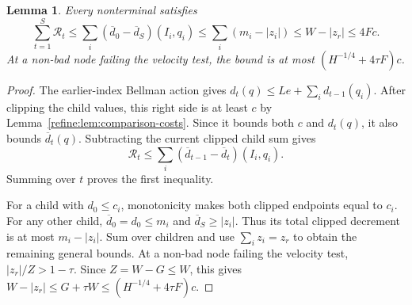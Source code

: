 \documentclass[11pt]{article}
\newtheorem{lemma}[theorem]{Lemma}
\theoremstyle{definition}
\newcommand{\1}{\mathbf 1}
\begin{document}
\begin{lemma}\label{refine:lem:decrement}
Every nonterminal satisfies
\[
 \sum_{t=1}^S\mathcal R_t
 \le\sum_i(\overline d_0-\overline d_S)(I_i,q_i)
 \le\sum_i(m_i-|z_i|)\le W-|z_r|\le4Fc.
\]
At a non-bad node failing the velocity test, the bound is at most $(H^{-1/4}+4\tau F)c$.
\end{lemma}
\begin{proof}
The earlier-index Bellman action gives
$d_t(q)\le Le+\sum_i d_{t-1}(q_i)$.
After clipping the child values, this right side is at least $c$ by
Lemma~\ref{refine:lem:comparison-costs}. Since it bounds both $c$ and
$d_t(q)$, it also bounds
$\overline d_t(q)$. Subtracting the current clipped child sum gives
\[
 \mathcal R_t\le
 \sum_i(\overline d_{t-1}-\overline d_t)(I_i,q_i).
\]
Summing over $t$ proves the first inequality.

For a child with $d_0\le c_i$, monotonicity makes both clipped endpoints
equal to $c_i$. For any other child,
$\overline d_0=d_0\le m_i$ and $\overline d_S\ge|z_i|$.
Thus its total clipped decrement is at most $m_i-|z_i|$.
Sum over children and use $\sum_i z_i=z_r$ to obtain the remaining
general bounds.
At a non-bad node failing the velocity test,
$|z_r|/Z>1-\tau$. Since $Z=W-G\le W$, this gives
$W-|z_r|\le G+\tau W\le(H^{-1/4}+4\tau F)c$.
\end{proof}
\end{document}
